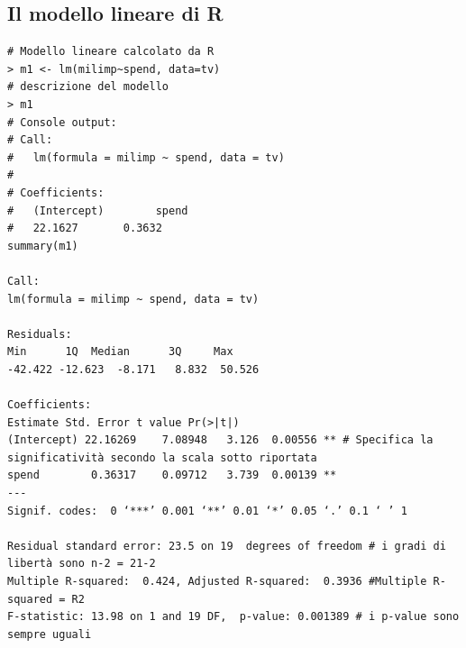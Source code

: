 \subsection{Il modello lineare di R}

\begin{lstlisting}
# Modello lineare calcolato da R
> m1 <- lm(milimp~spend, data=tv)
# descrizione del modello
> m1
# Console output:
# Call:
#	lm(formula = milimp ~ spend, data = tv)
#
# Coefficients:
# 	(Intercept)        spend  
# 	22.1627       0.3632  
summary(m1)

Call:
lm(formula = milimp ~ spend, data = tv)

Residuals:
Min      1Q  Median      3Q     Max 
-42.422 -12.623  -8.171   8.832  50.526 

Coefficients:
Estimate Std. Error t value Pr(>|t|)   
(Intercept) 22.16269    7.08948   3.126  0.00556 ** # Specifica la significatività secondo la scala sotto riportata
spend        0.36317    0.09712   3.739  0.00139 **
---
Signif. codes:  0 ‘***’ 0.001 ‘**’ 0.01 ‘*’ 0.05 ‘.’ 0.1 ‘ ’ 1

Residual standard error: 23.5 on 19  degrees of freedom # i gradi di libertà sono n-2 = 21-2
Multiple R-squared:  0.424, Adjusted R-squared:  0.3936 #Multiple R-squared = R2
F-statistic: 13.98 on 1 and 19 DF,  p-value: 0.001389 # i p-value sono sempre uguali

\end{lstlisting}

